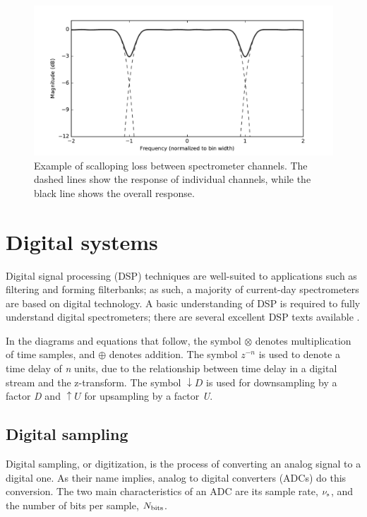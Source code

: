 \documentclass{ws-rv961x669}
\begin{document}
\begin{figure}
 \centering
 \includegraphics[width=\textwidth]{./figures/pfb_scalloping}
 \caption{Example of scalloping loss between spectrometer channels. The dashed lines show the response of individual channels, while the black line shows the overall response.\label{fig:scalloping}}
\end{figure}


\section{Digital systems}

Digital signal processing (DSP) techniques are well-suited to applications such as filtering and forming filterbanks; as such, a majority of current-day spectrometers are based on digital technology. A basic understanding of DSP is required to fully understand digital spectrometers; there are several excellent DSP texts available \citet{bookLyonsDSP, BookSmithDSP}. 

In the diagrams and equations that follow, the symbol $\otimes$ denotes multiplication of time samples, and $\oplus$ denotes addition. The symbol $z^{-n}$ is used to denote a time delay of \emph{n} units, due to the relationship between time delay in a digital stream and the z-transform. The symbol $\downarrow D$ is used for downsampling by a factor \emph{D} and $\uparrow U$ for upsampling by a factor \emph{U}.

\subsection{Digital sampling}

Digital sampling, or digitization, is the process of converting an analog signal to a digital one. As their name implies, analog to digital converters (ADCs) do this conversion. The two main characteristics of an ADC are its sample rate, $\nu_{\rm{s}}$, and the number of bits per sample, $N_{\rm{bits}}$.
\end{document}
